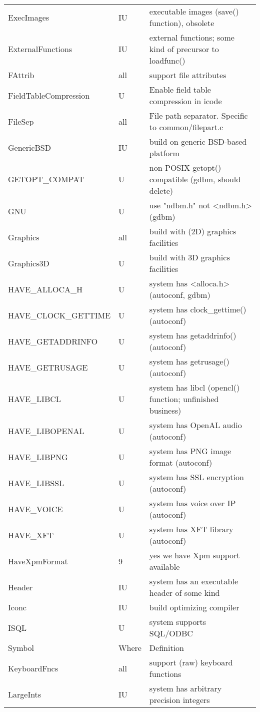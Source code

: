 \begin{xtabular}{|m{1.8in}|m{0.5in}|m{4.0in}|}
ExecImages & IU & executable images (save() function), obsolete \\
ExternalFunctions & IU & external functions; some kind of precursor to loadfunc() \\
FAttrib & all & support file attributes \\
FieldTableCompression & U & Enable field table compression in icode \\
FileSep & all & File path separator. Specific to common/filepart.c \\
GenericBSD & IU & build on generic BSD-based platform \\
GETOPT\_COMPAT & U & non-POSIX getopt() compatible (gdbm, should delete) \\
GNU & U & use "ndbm.h" not <ndbm.h> (gdbm) \\
Graphics & all & build with (2D) graphics facilities \\
Graphics3D & U & build with 3D graphics facilities \\
HAVE\_ALLOCA\_H & U & system has <alloca.h> (autoconf, gdbm) \\
HAVE\_CLOCK\_GETTIME & U & system has clock\_gettime() (autoconf) \\
HAVE\_GETADDRINFO & U & system has getaddrinfo() (autoconf) \\
HAVE\_GETRUSAGE & U & system has getrusage() (autoconf) \\
HAVE\_LIBCL & U & system has libcl (opencl() function; unfinished business) \\
HAVE\_LIBOPENAL & U & system has OpenAL audio (autoconf) \\
HAVE\_LIBPNG & U & system has PNG image format (autoconf) \\
HAVE\_LIBSSL & U & system has SSL encryption (autoconf) \\
HAVE\_VOICE & U & system has voice over IP (autoconf) \\
HAVE\_XFT & U & system has XFT library (autoconf) \\
HaveXpmFormat & 9 & yes we have Xpm support available \\
Header & IU & system has an executable header of some kind \\
Iconc & IU & build optimizing compiler \\
ISQL & U & system supports SQL/ODBC \\
Symbol & Where & Definition \\ \hline
KeyboardFncs & all & support (raw) keyboard functions \\
LargeInts & IU & system has arbitrary precision integers \\

\end{xtabular}

